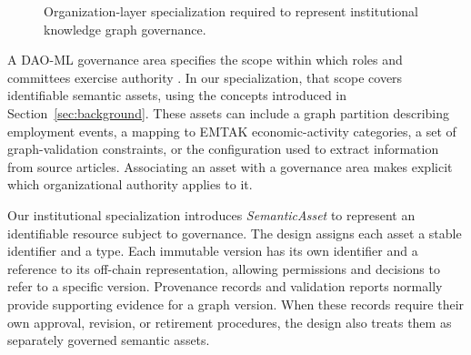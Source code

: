 \documentclass[journal]{IEEEtran}
\begin{document}
\begin{figure}[t]
\centering
{}
\caption{Organization-layer specialization required to represent
institutional knowledge graph governance.}
\label{fig:org_specialization_taxonomy}
\end{figure}

A DAO-ML governance area specifies the scope within which
roles and committees exercise authority
\cite{Avanzo2024DAOML}. In our specialization, that scope
covers identifiable semantic assets, using the concepts
introduced in Section~\ref{sec:background}. These assets
can include a graph partition describing employment events,
a mapping to EMTAK economic-activity categories, a set of
graph-validation constraints, or the configuration used
to extract information from source articles. Associating
an asset with a governance area makes explicit which
organizational authority applies to it.

Our institutional specialization introduces
\emph{SemanticAsset} to represent an identifiable resource
subject to governance. The design assigns each asset a stable
identifier and a type. Each immutable version has its own
identifier and a reference to its off-chain representation,
allowing permissions and decisions to refer to a specific
version.
Provenance records and validation reports normally provide
supporting evidence for a graph version. When these records
require their own approval, revision, or retirement procedures,
the design also treats them as separately governed semantic
assets.
\end{document}
